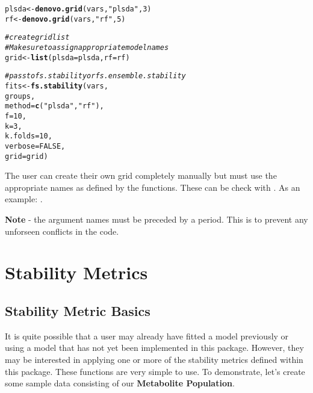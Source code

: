 \documentclass[12pt]{article}\usepackage[]{graphicx}\usepackage[usenames,dvipsnames]{color}
\makeatletter
\newcommand{\hlnum}[1]{\textcolor[rgb]{0.686,0.059,0.569}{#1}}%
\newcommand{\hlstr}[1]{\textcolor[rgb]{0.192,0.494,0.8}{#1}}%
\newcommand{\hlcom}[1]{\textcolor[rgb]{0.678,0.584,0.686}{\textit{#1}}}%
\newcommand{\hlstd}[1]{\textcolor[rgb]{0.345,0.345,0.345}{#1}}%
\newcommand{\hlkwb}[1]{\textcolor[rgb]{0.69,0.353,0.396}{#1}}%
\newcommand{\hlkwc}[1]{\textcolor[rgb]{0.333,0.667,0.333}{#1}}%
\newcommand{\hlkwd}[1]{\textcolor[rgb]{0.737,0.353,0.396}{\textbf{#1}}}%
\newenvironment{kframe}{%
 \def\at@end@of@kframe{}%
 \ifinner\ifhmode%
  \def\at@end@of@kframe{\end{minipage}}%
  \begin{minipage}{\columnwidth}%
 \fi\fi%
 \def\FrameCommand##1{\hskip\@totalleftmargin \hskip-\fboxsep
 \colorbox{shadecolor}{##1}\hskip-\fboxsep
     \hskip-\linewidth \hskip-\@totalleftmargin \hskip\columnwidth}%
 \MakeFramed {\advance\hsize-\width
   \@totalleftmargin\z@ \linewidth\hsize
   \@setminipage}}%
 {\par\unskip\endMakeFramed%
 \at@end@of@kframe}
\newenvironment{knitrout}{}{} %
\makeatother
\begin{document}
\begin{knitrout}
\color{fgcolor}\begin{kframe}
\begin{alltt}
\hlstd{plsda} \hlkwb{<-} \hlkwd{denovo.grid}\hlstd{(vars,} \hlstr{"plsda"}\hlstd{,} \hlnum{3}\hlstd{)}
\hlstd{rf} \hlkwb{<-} \hlkwd{denovo.grid}\hlstd{(vars,} \hlstr{"rf"}\hlstd{,} \hlnum{5}\hlstd{)}

\hlcom{# create grid list}
\hlcom{# Make sure to assign appropriate model names}
\hlstd{grid} \hlkwb{<-} \hlkwd{list}\hlstd{(}\hlkwc{plsda}\hlstd{=plsda,} \hlkwc{rf}\hlstd{=rf)}

\hlcom{# pass to fs.stability or fs.ensemble.stability}
\hlstd{fits} \hlkwb{<-} \hlkwd{fs.stability}\hlstd{(vars,}
                    \hlstd{groups,}
                    \hlkwc{method} \hlstd{=} \hlkwd{c}\hlstd{(}\hlstr{"plsda"}\hlstd{,} \hlstr{"rf"}\hlstd{),}
                    \hlkwc{f} \hlstd{=} \hlnum{10}\hlstd{,}
                    \hlkwc{k} \hlstd{=} \hlnum{3}\hlstd{,}
                    \hlkwc{k.folds} \hlstd{=} \hlnum{10}\hlstd{,}
                    \hlkwc{verbose} \hlstd{=} \hlnum{FALSE}\hlstd{,}
                    \hlkwc{grid} \hlstd{= grid)}
\end{alltt}
\end{kframe}
\end{knitrout}

The user can create their own grid completely manually but must use the 
appropriate names as defined by the functions.  These can be check with 
.  As an example: .  

\textbf{Note} - the argument names must be preceded by a period.  This is to
prevent any unforseen conflicts in the code.

\newpage
\maketitle
\section{Stability Metrics}
\subsection{Stability Metric Basics}

It is quite possible that a user may already have fitted a model previously
or using a model that has not yet been implemented in this package.  However,
they may be interested in applying one or more of the stability metrics
defined within this package.  These functions are very simple to use.  To 
demonstrate, let's create some sample data consisting of our \textbf{Metabolite
Population}.
\end{document}
